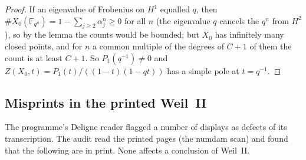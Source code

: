 \begin{proof}
If an eigenvalue of Frobenius on $H^1$ equalled $q$, then $\#X_0(\mathbb{F}_{q^n})=1-\sum_{j\ge2}\alpha_j^n\ge0$ for all $n$ (the eigenvalue $q$ cancels the $q^n$ from $H^2$), so by the lemma the counts would be bounded; but $X_0$ has infinitely many closed points, and for $n$ a common multiple of the degrees of $C+1$ of them the count is at least $C+1$. So $P_1(q^{-1})\ne0$ and $Z(X_0,t)=P_1(t)/((1-t)(1-qt))$ has a simple pole at $t=q^{-1}$.
\end{proof}

\subsection{Misprints in the printed Weil~II}\label{ssec:misprints}

The programme's Deligne reader flagged a number of displays as defects of its transcription. The audit read the printed pages (the numdam scan) and found that the following are in print. None affects a conclusion of Weil~II.

